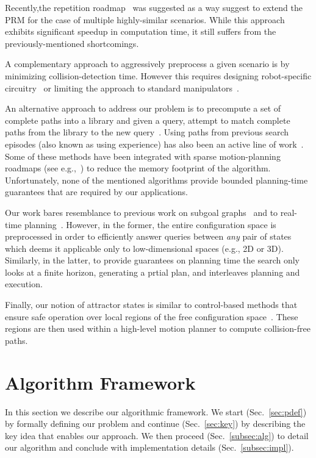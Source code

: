 \documentclass[letterpaper]{article} %
\begin{document}
Recently,the repetition roadmap~\cite{LA18} was suggested as a way suggest  to extend the \textsf{PRM} for the case of multiple highly-similar scenarios.
While this approach exhibits significant speedup in computation time, it still suffers from the previously-mentioned shortcomings.

A complementary approach to aggressively preprocess a given scenario is by minimizing collision-detection time.
However this requires designing robot-specific
circuitry~\cite{MFQSK16}
or limiting the approach to standard manipulators~\cite{YMILV18}.

An alternative approach to address our problem is to precompute a set of complete paths into a library and given a query, attempt to match complete paths from the library to the new query~\cite{berenson2012robot,jetchev2013fast}.
Using paths from previous search episodes (also known as using experience) has also been an active line of work~\cite{PCCL12,PDCL13,BAG12,CSMOC15}.
Some of these methods have been integrated with sparse motion-planning roadmaps (see e.g.,~\cite{SSAH14,DB14}) to reduce the memory footprint of the algorithm.
Unfortunately, none of the mentioned algorithms provide bounded planning-time guarantees that are required by our applications.

Our work bares resemblance to previous work on 
subgoal graphs~\cite{UK17,UK18} and to real-time planning~\cite{KL06,KS09,K90}.
However, in the former, the entire configuration space is preprocessed in order to efficiently answer queries between \emph{any} pair of states which deems it applicable only to low-dimensional spaces (e.g., 2D or 3D).
Similarly, in the latter, to provide guarantees on planning time the search only looks at a finite horizon, generating a prtial plan,  and interleaves planning and execution.

Finally, our notion of attractor states is similar to control-based methods that  ensure safe operation over local regions of the free configuration space~\cite{CRC03,CCR06}.
These regions are then used within a high-level motion planner to compute collision-free paths.

\section{Algorithm Framework}
\label{sec:alg}
In this section we describe our algorithmic framework. We start (Sec.~\ref{sec:pdef}) by formally defining our problem and continue (Sec.~\ref{sec:key}) by describing the key idea that enables our approach.
We then proceed (Sec.~\ref{subsec:alg}) to detail our algorithm and conclude with implementation details (Sec.~\ref{subsec:impl}).
\end{document}
